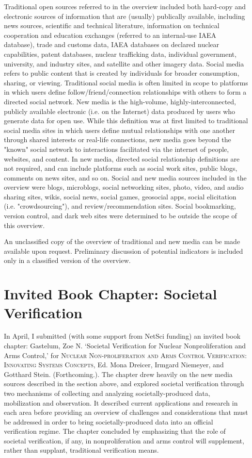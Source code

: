 \documentclass{article} %
\begin{document}
Traditional open sources referred to in the overview included both hard-copy and electronic sources of information that are (usually) publically available, including news sources, scientific and technical literature, information on technical cooperation and education exchanges (referred to an internal-use IAEA database), trade and customs data, IAEA databases on declared nuclear capabilities, patent databases, nuclear trafficking data, individual government, university, and industry sites, and satellite and other imagery data. 
Social media refers to public content that is created by individuals for broader consumption, sharing, or viewing. Traditional social media is often limited in scope to platforms in which users define follow/friend/connection relationships with others to form a directed social network. New media is the high-volume, highly-interconnected, publicly available electronic (i.e. on the Internet) data produced by users who generate data for open use. While this definition was at first limited to traditional social media sites in which users define mutual relationships with one another through shared interests or real-life connections, new media goes beyond the "known" social network to interactions facilitated via the internet of people, websites, and content. In new media, directed social relationship definitions are not required, and can include platforms such as social work sites, public blogs, comments on news sites, and so on. Social and new media sources included in the overview were blogs, microblogs, social networking sites, photo, video, and audio sharing sites, wikis, social news, social games, geosocial apps, social elicitation (i.e. "crowdsourcing"), and review/recommendation sites. Social bookmarking, version control, and dark web sites were determined to be outside the scope of this overview.

An unclassified copy of the overview of traditional and new media can be made available upon request. Preliminary discussion of potential indicators is included only in a classified version of the overview.

\section*{Invited Book Chapter: Societal Verification}
In April, I submitted (with some support from NetSci funding) an invited book chapter: Gastelum, Zoe N. `Societal Verification for Nuclear Nonproliferation and Arms Control,' for \textsc{Nuclear Non-proliferation and Arms Control Verification: Innovating Systems Concepts}, Ed. Mona Dreicer, Irmgard Niemeyer, and Gotthard Stein. (Forthcoming.). The chapter drew heavily on the new media sources described in the section above, and explored societal verification through two mechanisms of collecting and analyzing societally-produced data, mobilization and observation. It described current applications and research in each area before providing an overview of challenges and considerations that must be addressed in order to bring societally-produced data into an official verification regime. The chapter concluded by emphasizing that the role of societal verification, if any, in nonproliferation and arms control will supplement, rather than supplant, traditional verification means.
\end{document}
